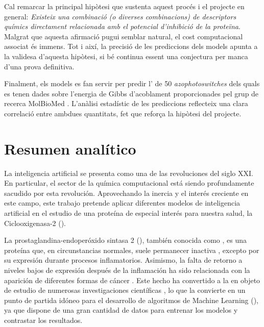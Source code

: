 \documentclass[11pt]{article}
\begin{document}
Cal remarcar la principal hipòtesi que sustenta aquest procés i el projecte en general: \emph{Existeix una combinació (o diverses combinacions) de descriptors químics directament relacionada amb el potencial d'inhibició de la proteïna}. Malgrat que aquesta afirmació pugui semblar natural, el cost computacional associat és immens. Tot i així, la precisió de les prediccions dels models apunta a la validesa d'aquesta hipòtesi, si bé continua essent una conjectura per manca d'una prova definitiva.

Finalment, els models es fan servir per predir l' de 50 \emph{azophotoswitches} dels quals es tenen dades sobre l'energia de Gibbs d'acoblament proporcionades pel grup de recerca MolBioMed \cite{molbiomed}. L'anàlisi estadístic de les prediccions reflecteix una clara correlació entre ambdues quantitats, fet que reforça la hipòtesi del projecte.
\newpage

\section*{Resumen analítico}
\hspace{0.55cm}La inteligencia artificial se presenta como una de las revoluciones del siglo XXI. En particular, el sector de la química computacional está siendo profundamente sacudido por esta revolución. Aprovechando la inercia y el interés creciente en este campo, este trabajo pretende aplicar diferentes modelos de inteligencia artificial en el estudio de una proteína de especial interés para nuestra salud, la Ciclooxigenasa-2 ().

La prostaglandina-endoperóxido sintasa 2 (), también conocida como , es una proteína que, en circunstancias normales, suele permanecer inactiva \cite{Cox2Location}, excepto por su expresión durante procesos inflamatorios. Asimismo, la falta de retorno a niveles bajos de expresión después de la inflamación ha sido relacionada con la aparición de diferentes formas de cáncer \cite{DefinitionCOX2CancerDictionary}. Este hecho ha convertido a la  en objeto de estudio de numerosas investigaciones científicas \cite{Cox2InhibitorsReview}, lo que la convierte en un punto de partida idóneo para el desarrollo de algoritmos de Machine Learning (), ya que dispone de una gran cantidad de datos para entrenar los modelos y contrastar los resultados.
\end{document}
